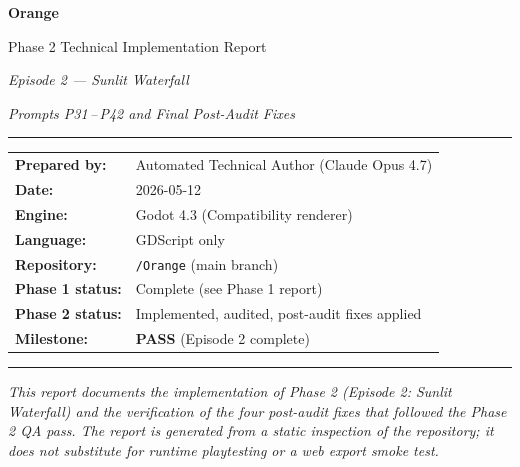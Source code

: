 \documentclass[12pt, a4paper]{article}
\begin{document}
\begin{titlepage}
  \centering
  \vspace*{2cm}
  {\Huge\bfseries\color{deepforest} Orange\par}
  \vspace{0.5cm}
  {\Large\color{mossgreen} Phase 2 Technical Implementation Report\par}
  \vspace{0.3cm}
  {\large\itshape Episode 2 --- Sunlit Waterfall\par}
  \vspace{0.2cm}
  {\normalsize\itshape Prompts P31\,--\,P42 and Final Post-Audit Fixes\par}
  \vspace{2cm}
  \rule{0.6\linewidth}{1pt}\par
  \vspace{1cm}
  \begin{tabular}{ll}
    \textbf{Prepared by:}     & Automated Technical Author (Claude Opus 4.7) \\
    \textbf{Date:}            & 2026-05-12 \\
    \textbf{Engine:}          & Godot 4.3 (Compatibility renderer) \\
    \textbf{Language:}        & GDScript only \\
    \textbf{Repository:}      & \texttt{/Orange} (main branch) \\
    \textbf{Phase 1 status:}  & Complete (see Phase 1 report) \\
    \textbf{Phase 2 status:}  & Implemented, audited, post-audit fixes applied \\
    \textbf{Milestone:}       & \textcolor{passgre}{\textbf{PASS}} (Episode 2 complete) \\
  \end{tabular}
  \vspace{2cm}
  \rule{0.6\linewidth}{0.4pt}\par
  \vspace{0.5cm}
  {\small\itshape This report documents the implementation of Phase 2 (Episode 2:
  Sunlit Waterfall) and the verification of the four post-audit fixes that
  followed the Phase 2 QA pass. The report is generated from a static
  inspection of the repository; it does not substitute for runtime
  playtesting or a web export smoke test.\par}
\end{titlepage}

\tableofcontents
\newpage
\end{document}
